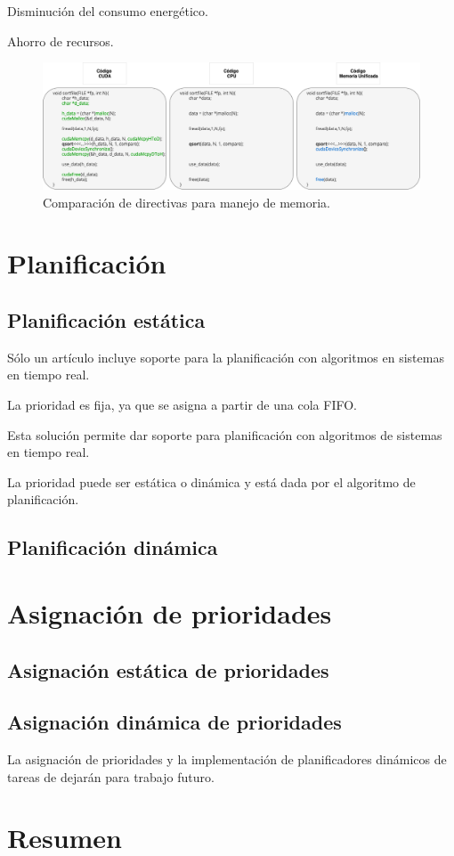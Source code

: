   Disminución del consumo energético.
  
  Ahorro de recursos.
  
  \begin{figure}[ht]
      \centering
        \includegraphics[scale=.50]{img/direcMem}
        \caption{Comparación de directivas para manejo de memoria.}
        \label{fig:direcMem}
    \end{figure}
  
\section{Planificación} 

\subsection{Planificación estática}

Sólo un artículo incluye soporte para la planificación con algoritmos en sistemas en tiempo real.

La prioridad es fija, ya que se asigna a partir de una cola FIFO.

Esta solución permite dar soporte para planificación con algoritmos de sistemas en tiempo real.

La prioridad puede ser estática o dinámica y está dada por el algoritmo de planificación.

\subsection{Planificación dinámica}
\section{Asignación de prioridades }

\subsection{Asignación estática de prioridades }

\subsection{Asignación dinámica de prioridades }
	La asignación de prioridades y la implementación de planificadores dinámicos de tareas de dejarán para trabajo futuro.
\section{Resumen}




